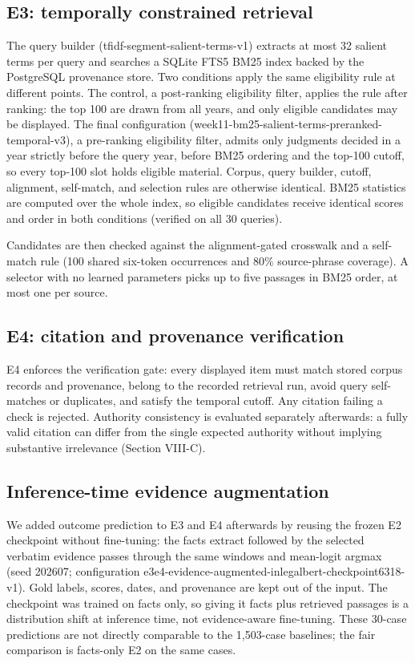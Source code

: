 \documentclass[conference]{IEEEtran}
\begin{document}
\subsection{E3: temporally constrained retrieval}
The query builder (tfidf-segment-salient-terms-v1) extracts at most 32 salient terms per query and searches a SQLite FTS5 BM25 index backed by the PostgreSQL provenance store. Two conditions apply the same eligibility rule at different points. The control, a post-ranking eligibility filter, applies the rule after ranking: the top 100 are drawn from all years, and only eligible candidates may be displayed. The final configuration (week11-bm25-salient-terms-preranked-temporal-v3), a pre-ranking eligibility filter, admits only judgments decided in a year strictly before the query year, before BM25 ordering and the top-100 cutoff, so every top-100 slot holds eligible material. Corpus, query builder, cutoff, alignment, self-match, and selection rules are otherwise identical. BM25 statistics are computed over the whole index, so eligible candidates receive identical scores and order in both conditions (verified on all 30 queries).

Candidates are then checked against the alignment-gated crosswalk and a self-match rule (100 shared six-token occurrences and 80\% source-phrase coverage). A selector with no learned parameters picks up to five passages in BM25 order, at most one per source.

\subsection{E4: citation and provenance verification}
E4 enforces the verification gate: every displayed item must match stored corpus records and provenance, belong to the recorded retrieval run, avoid query self-matches or duplicates, and satisfy the temporal cutoff. Any citation failing a check is rejected. Authority consistency is evaluated separately afterwards: a fully valid citation can differ from the single expected authority without implying substantive irrelevance (Section VIII-C).

\subsection{Inference-time evidence augmentation}
We added outcome prediction to E3 and E4 afterwards by reusing the frozen E2 checkpoint without fine-tuning: the facts extract followed by the selected verbatim evidence passes through the same windows and mean-logit argmax (seed 202607; configuration e3e4-evidence-augmented-inlegalbert-checkpoint6318-v1). Gold labels, scores, dates, and provenance are kept out of the input. The checkpoint was trained on facts only, so giving it facts plus retrieved passages is a distribution shift at inference time, not evidence-aware fine-tuning. These 30-case predictions are not directly comparable to the 1,503-case baselines; the fair comparison is facts-only E2 on the same cases.
\end{document}
